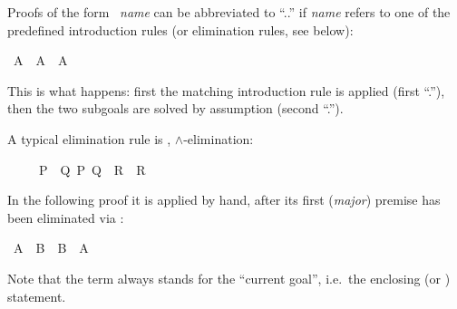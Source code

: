 \begin{isabellebody}
\begin{isamarkuptext}
Proofs of the form ~\emph{name}\isa{{\isacharparenright}}
can be abbreviated to ``..''  if \emph{name} refers to one of the
predefined introduction rules (or elimination rules, see below):%
\end{isamarkuptext}%
\isamarkuptrue%
\ {\isachardoublequote}A\ {\isasymlongrightarrow}\ A\ {\isasymand}\ A{\isachardoublequote}\isanewline
\isamarkupfalse%
\isamarkupfalse%
\isamarkupfalse%
\isamarkupfalse%
\isamarkupfalse%
\isamarkupfalse%
%
\begin{isamarkuptext}%
\noindent
This is what happens: first the matching introduction rule 
is applied (first ``.''), then the two subgoals are solved by assumption
(second ``.'').%
\end{isamarkuptext}%
\isamarkuptrue%
%
\isamarkuptrue%
%
\begin{isamarkuptext}%
A typical elimination rule is , $\land$-elimination:
\begin{isabelle}%
\ \ \ \ \ {\isasymlbrakk}{\isacharquery}P\ {\isasymand}\ {\isacharquery}Q{\isacharsemicolon}\ {\isasymlbrakk}{\isacharquery}P{\isacharsemicolon}\ {\isacharquery}Q{\isasymrbrakk}\ {\isasymLongrightarrow}\ {\isacharquery}R{\isasymrbrakk}\ {\isasymLongrightarrow}\ {\isacharquery}R%
\end{isabelle}  In the following proof it is applied
by hand, after its first (\emph{major}) premise has been eliminated via
:%
\end{isamarkuptext}%
\isamarkuptrue%
\ {\isachardoublequote}A\ {\isasymand}\ B\ {\isasymlongrightarrow}\ B\ {\isasymand}\ A{\isachardoublequote}\isanewline
\isamarkupfalse%
\isamarkupfalse%
\isamarkupfalse%
\isamarkupfalse%
\isamarkupfalse%
\isamarkupfalse%
\isamarkupfalse%
\isamarkupfalse%
\isamarkupfalse%
\isamarkupfalse%
%
\begin{isamarkuptext}%
\noindent Note that the term  always stands for the
``current goal'', i.e.\ the enclosing  (or
) statement.


\end{isamarkuptext}
\end{isabellebody}
